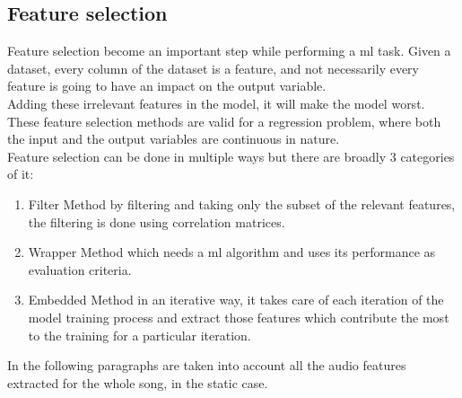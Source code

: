 \subsection{Feature selection}\label{feature_selection_5}
Feature selection become an important step while performing a \gls{ml} task. Given a dataset, every column of the dataset is a feature, and not necessarily every feature is going to have an impact on the output variable.
\\
Adding these irrelevant features in the model, it will make the model worst.
\\
These feature selection methods are valid for a regression problem, where both the input and the output variables are continuous in nature.
\\ \indent
Feature selection can be done in multiple ways but there are broadly 3 categories of it:
\begin{enumerate}
	\item Filter Method by filtering and taking only the subset of the relevant features, the filtering is done using correlation matrices. 
	\item Wrapper Method which needs a \gls{ml} algorithm and uses its performance as evaluation criteria.
	\item Embedded Method in an iterative way, it takes care of each iteration of the model training process and extract those features which contribute the most to the training for a particular iteration.
\end{enumerate}
In the following paragraphs are taken into account all the audio features extracted for the whole song, in the static case.

